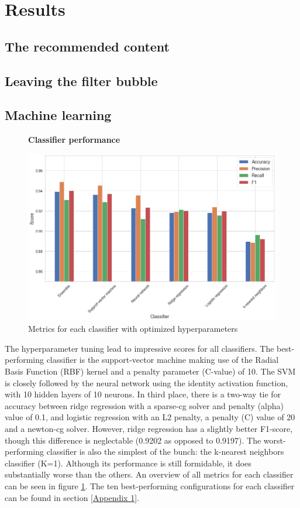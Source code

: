 \documentclass[../main.tex]{subfiles}
\begin{document}
\section{Results}

\subsection{The recommended content}

\subsection{Leaving the filter bubble}

\subsection{Machine learning}

\begin{figure}[t!]
  \textbf{Classifier performance}\par\medskip
  \centering
  \includegraphics[keepaspectratio, width=\textwidth]{images/classifier_results.png}
  \caption{Metrics for each classifier with optimized hyperparameters}
  \label{fig:ML_scores}
\end{figure}

The hyperparameter tuning lead to impressive scores for all classifiers. The best-performing classifier is the support-vector machine making use of the Radial Basis Function (RBF) kernel and a penalty parameter (C-value) of 10. The SVM is closely followed by the neural network using the identity activation function, with 10 hidden layers of 10 neurons. In third place, there is a two-way tie for accuracy between ridge regression with a sparse-cg solver and penalty (alpha) value of 0.1, and logistic regression with an L2 penalty, a penalty (C) value of 20 and a newton-cg solver. However, ridge regression has a slightly better F1-score, though this difference is neglectable (0.9202 as opposed to 0.9197). The worst-performing classifier is also the simplest of the bunch: the k-nearest neighbors classifier (K=1). Although its performance is still formidable, it does substantially worse than the others. An overview of all metrics for each classifier can be seen in figure \ref{fig:ML_scores}. The ten best-performing configurations for each classifier can be found in section \ref{Appendix 1}.
\end{document}
